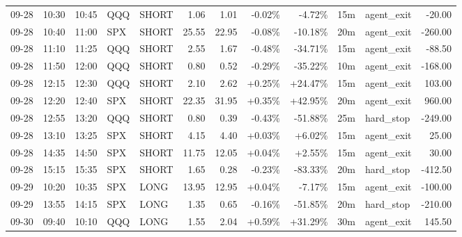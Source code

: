 \documentclass[11pt,a4paper]{article}
\begin{document}
\begin{center}
\begin{longtable}{>{\color{txtmain}}l l l l l r r r r r >{\color{txtmain}}l r}
09-28 & 10:30 & 10:45 & QQQ & SHORT & 1.06 & 1.01 & \textcolor{lossred}{-0.02\%} & \textcolor{lossred}{-4.72\%} & 15m & agent\_exit & \textcolor{lossred}{-20.00} \\
09-28 & 10:40 & 11:00 & SPX & SHORT & 25.55 & 22.95 & \textcolor{lossred}{-0.08\%} & \textcolor{lossred}{-10.18\%} & 20m & agent\_exit & \textcolor{lossred}{-260.00} \\
09-28 & 11:10 & 11:25 & QQQ & SHORT & 2.55 & 1.67 & \textcolor{lossred}{-0.48\%} & \textcolor{lossred}{-34.71\%} & 15m & agent\_exit & \textcolor{lossred}{-88.50} \\
09-28 & 11:50 & 12:00 & QQQ & SHORT & 0.80 & 0.52 & \textcolor{lossred}{-0.29\%} & \textcolor{lossred}{-35.22\%} & 10m & agent\_exit & \textcolor{lossred}{-168.00} \\
09-28 & 12:15 & 12:30 & QQQ & SHORT & 2.10 & 2.62 & \textcolor{wingreen}{+0.25\%} & \textcolor{wingreen}{+24.47\%} & 15m & agent\_exit & \textcolor{wingreen}{103.00} \\
09-28 & 12:20 & 12:40 & SPX & SHORT & 22.35 & 31.95 & \textcolor{wingreen}{+0.35\%} & \textcolor{wingreen}{+42.95\%} & 20m & agent\_exit & \textcolor{wingreen}{960.00} \\
09-28 & 12:55 & 13:20 & QQQ & SHORT & 0.80 & 0.39 & \textcolor{lossred}{-0.43\%} & \textcolor{lossred}{-51.88\%} & 25m & hard\_stop & \textcolor{lossred}{-249.00} \\
09-28 & 13:10 & 13:25 & SPX & SHORT & 4.15 & 4.40 & \textcolor{wingreen}{+0.03\%} & \textcolor{wingreen}{+6.02\%} & 15m & agent\_exit & \textcolor{wingreen}{25.00} \\
09-28 & 14:35 & 14:50 & SPX & SHORT & 11.75 & 12.05 & \textcolor{wingreen}{+0.04\%} & \textcolor{wingreen}{+2.55\%} & 15m & agent\_exit & \textcolor{wingreen}{30.00} \\
09-28 & 15:15 & 15:35 & SPX & SHORT & 1.65 & 0.28 & \textcolor{lossred}{-0.23\%} & \textcolor{lossred}{-83.33\%} & 20m & hard\_stop & \textcolor{lossred}{-412.50} \\
09-29 & 10:20 & 10:35 & SPX & LONG & 13.95 & 12.95 & \textcolor{wingreen}{+0.04\%} & \textcolor{lossred}{-7.17\%} & 15m & agent\_exit & \textcolor{lossred}{-100.00} \\
09-29 & 13:55 & 14:15 & SPX & LONG & 1.35 & 0.65 & \textcolor{lossred}{-0.16\%} & \textcolor{lossred}{-51.85\%} & 20m & hard\_stop & \textcolor{lossred}{-210.00} \\
09-30 & 09:40 & 10:10 & QQQ & LONG & 1.55 & 2.04 & \textcolor{wingreen}{+0.59\%} & \textcolor{wingreen}{+31.29\%} & 30m & agent\_exit & \textcolor{wingreen}{145.50} \\

\end{longtable}
\end{center}
\end{document}
